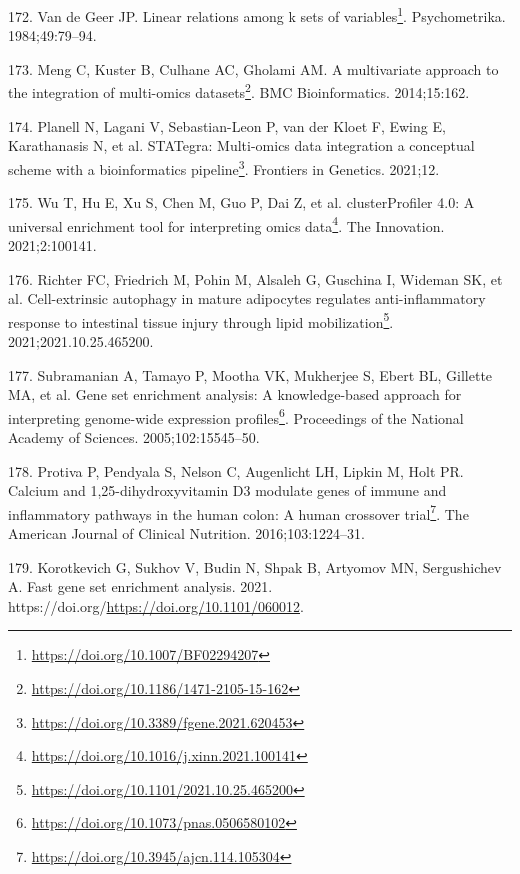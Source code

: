 \documentclass[
  12pt,
  a4paper,
  twoside,
  openright]{book}
\DeclareRobustCommand{\href}[2]{#2\footnote{\url{#1}}}
\newlength{\cslhangindent}
\newlength{\cslentryspacingunit} %
\newenvironment{CSLReferences}[2] %
 {%
  \setlength{\parindent}{0pt}
  \ifodd #1
  \let\oldpar\par
  \def\par{\hangindent=\cslhangindent\oldpar}
  \fi
  \setlength{\parskip}{#2\cslentryspacingunit}
 }%
 {}
\begin{document}
\begin{CSLReferences}{0}{0}
\leavevmode{}%
172. Van de Geer JP. \href{https://doi.org/10.1007/BF02294207}{Linear relations among k sets of variables}. Psychometrika. 1984;49:79--94.

\leavevmode{}%
173. Meng C, Kuster B, Culhane AC, Gholami AM. \href{https://doi.org/10.1186/1471-2105-15-162}{A multivariate approach to the integration of multi-omics datasets}. BMC Bioinformatics. 2014;15:162.

\leavevmode{}%
174. Planell N, Lagani V, Sebastian-Leon P, van der Kloet F, Ewing E, Karathanasis N, et al. \href{https://doi.org/10.3389/fgene.2021.620453}{STATegra: Multi-omics data integration {\textendash} a conceptual scheme with a bioinformatics pipeline}. Frontiers in Genetics. 2021;12.

\leavevmode{}%
175. Wu T, Hu E, Xu S, Chen M, Guo P, Dai Z, et al. \href{https://doi.org/10.1016/j.xinn.2021.100141}{clusterProfiler 4.0: A universal enrichment tool for interpreting omics data}. The Innovation. 2021;2:100141.

\leavevmode{}%
176. Richter FC, Friedrich M, Pohin M, Alsaleh G, Guschina I, Wideman SK, et al. \href{https://doi.org/10.1101/2021.10.25.465200}{Cell-extrinsic autophagy in mature adipocytes regulates anti-inflammatory response to intestinal tissue injury through lipid mobilization}. 2021;2021.10.25.465200.

\leavevmode{}%
177. Subramanian A, Tamayo P, Mootha VK, Mukherjee S, Ebert BL, Gillette MA, et al. \href{https://doi.org/10.1073/pnas.0506580102}{Gene set enrichment analysis: A knowledge-based approach for interpreting genome-wide expression profiles}. Proceedings of the National Academy of Sciences. 2005;102:15545--50.

\leavevmode{}%
178. Protiva P, Pendyala S, Nelson C, Augenlicht LH, Lipkin M, Holt PR. \href{https://doi.org/10.3945/ajcn.114.105304}{Calcium and 1,25-dihydroxyvitamin D3 modulate genes of immune and inflammatory pathways in the human colon: A human crossover trial}. The American Journal of Clinical Nutrition. 2016;103:1224--31.

\leavevmode{}%
179. Korotkevich G, Sukhov V, Budin N, Shpak B, Artyomov MN, Sergushichev A. Fast gene set enrichment analysis. 2021. https://doi.org/\url{https://doi.org/10.1101/060012}.


\end{CSLReferences}
\end{document}
